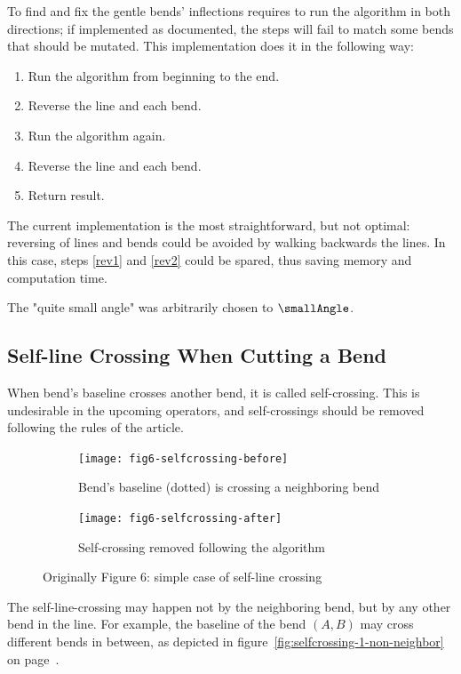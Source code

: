 \documentclass[a4paper]{article}
\newcommand{\onpage}[1]{\ref{#1} on page~\pageref{#1}}
\begin{document}
To find and fix the gentle bends' inflections requires to run the algorithm in
both directions; if implemented as documented, the steps will fail to match
some bends that should be mutated. This implementation does it in the following
way:

\begin{enumerate}
    \item Run the algorithm from beginning to the end.
    \item \label{rev1} Reverse the line and each bend.
    \item Run the algorithm again.
    \item \label{rev2} Reverse the line and each bend.
    \item Return result.
\end{enumerate}

The current implementation is the most straightforward, but not optimal:
reversing of lines and bends could be avoided by walking backwards the lines.
In this case, steps \ref{rev1} and \ref{rev2} could be spared, thus saving
memory and computation time.

The "quite small angle" was arbitrarily chosen to $\smallAngle$.

\subsection{Self-line Crossing When Cutting a Bend}

When bend's baseline crosses another bend, it is called self-crossing. This is
undesirable in the upcoming operators, and self-crossings should be removed
following the rules of the article.

\begin{figure}[h]
    \centering
    \begin{subfigure}[b]{.4\textwidth}
        \texttt{[image: fig6-selfcrossing-before]}
        \caption{Bend's baseline (dotted) is crossing a neighboring bend}
    \end{subfigure}
    \hfill
    \begin{subfigure}[b]{.4\textwidth}
        \texttt{[image: fig6-selfcrossing-after]}
        \caption{Self-crossing removed following the algorithm}
    \end{subfigure}
    \caption{Originally Figure 6: simple case of self-line crossing}
    \label{fig:fig6-selfcrossing}
\end{figure}

The self-line-crossing may happen not by the neighboring bend, but by any other
bend in the line. For example, the baseline of the bend $(A, B)$ may cross
different bends in between, as depicted in
figure~\onpage{fig:selfcrossing-1-non-neighbor}.
\end{document}
